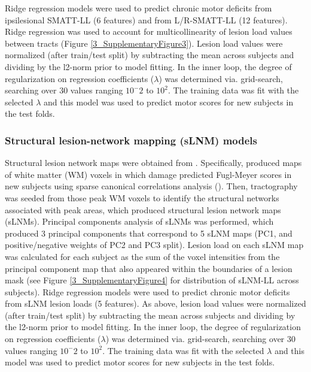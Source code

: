 \documentclass[phd,tocprelim]{cornell}
\begin{document}
Ridge regression models were used to predict chronic motor deficits from ipsilesional SMATT-LL (6 features) and from L/R-SMATT-LL (12 features). Ridge regression was used to account for multicollinearity of lesion load values between tracts (Figure \ref{3_SupplementaryFigure3}). Lesion load values were normalized (after train/test split) by subtracting the mean across subjects and dividing by the l2-norm prior to model fitting. In the inner loop, the degree of regularization on regression coefficients ($\lambda$) was determined via. grid-search, searching over 30 values ranging $10^-2$ to $10^2$. The training data was fit with the selected $\lambda$ and this model was used to predict motor scores for new subjects in the test folds.

\subsubsection{Structural lesion-network mapping (sLNM) models}
Structural lesion network maps were obtained from \cite{Bowren2022-rs}. Specifically, \cite{Bowren2022-rs} produced maps of white matter (WM) voxels in which damage predicted Fugl-Meyer scores in new subjects using sparse canonical correlations analysis (\cite{Pustina2018-xv}). Then, tractography was seeded from those peak WM voxels to identify the structural networks associated with peak areas, which produced structural lesion network maps (sLNMs). Principal components analysis of sLNMs was performed, which produced 3 principal components that correspond to 5 sLNM maps (PC1, and positive/negative weights of PC2 and PC3 split). Lesion load on each sLNM map was calculated for each subject as the sum of the voxel intensities from the principal component map that also appeared within the boundaries of a lesion mask (see Figure \ref{3_SupplementaryFigure4} for distribution of sLNM-LL across subjects). Ridge regression models were used to predict chronic motor deficits from sLNM lesion loads (5 features). As above, lesion load values were normalized (after train/test split) by subtracting the mean across subjects and dividing by the l2-norm prior to model fitting. In the inner loop, the degree of regularization on regression coefficients ($\lambda$) was determined via. grid-search, searching over 30 values ranging $10^-2$ to $10^2$. The training data was fit with the selected $\lambda$ and this model was used to predict motor scores for new subjects in the test folds. 
\end{document}
